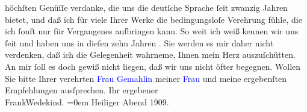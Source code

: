                höchſten Genüſſe verdanke, die uns die deutſche Sprache ſeit zwanzig Jahren bietet,
               und daß ich für viele Ihrer Werke die bedingungsloſe Verehrung fühle, die ich ſonſt
               nur für Vergangenes aufbringen kann. So weit ich weiß kennen wir uns ſeit \label{K_L01909_1v}\label{K_L01909_1h} und haben
               uns in dieſen zehn Jahren {\pb}\label{K_L01909_2v}\label{K_L01909_2h}. Sie werden es mir daher nicht
               verdenken, daß ich die Gelegenheit wahrneme, Ihnen mein Herz auszuſchütten. An mir
               ſoll es doch gewiß nicht liegen, daß wir uns nicht öfter begegnen.\pend
           \pstart
           Wollen Sie bitte Ihrer verehrten \textcolor{blue}{Frau
                  Gemahlin}{} meiner \textcolor{blue}{Frau}{} und
               meine ergebenſten Empfehlungen ausſprechen.\pend
           \pstart
           Ihr ergebener{\\[\baselineskip]}\spacefill\mbox{FrankWedekind.}\pend
           \leftskip=0em{}\pstart
           Heiliger Abend 1909.\pend
           \endnumbering{}  
      